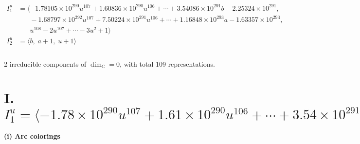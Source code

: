 \documentclass[1p]{elsarticle_modified}
\theoremstyle{definition}
\begin{document}
\begin{align*}
I^u_{1}&=\langle 
-1.78105\times10^{290} u^{107}+1.60836\times10^{290} u^{106}+\cdots+3.54086\times10^{291} b-2.25324\times10^{291},\\
\phantom{I^u_{1}}&\phantom{= \langle  }-1.68797\times10^{292} u^{107}+7.50224\times10^{291} u^{106}+\cdots+1.16848\times10^{293} a-1.63357\times10^{293},\\
\phantom{I^u_{1}}&\phantom{= \langle  }u^{108}-2 u^{107}+\cdots-3 u^2+1\rangle \\
I^u_{2}&=\langle 
b,\;a+1,\;u+1\rangle \\
\\
\end{align*}
\raggedright * 2 irreducible components of $\dim_{\mathbb{C}}=0$, with total 109 representations.\\
\newpage
\renewcommand{\arraystretch}{1}
\centering \section*{I. $I^u_{1}= \langle -1.78\times10^{290} u^{107}+1.61\times10^{290} u^{106}+\cdots+3.54\times10^{291} b-2.25\times10^{291},\;-1.69\times10^{292} u^{107}+7.50\times10^{291} u^{106}+\cdots+1.17\times10^{293} a-1.63\times10^{293},\;u^{108}-2 u^{107}+\cdots-3 u^2+1 \rangle$}
\flushleft \textbf{(i) Arc colorings}\\
\end{document}
